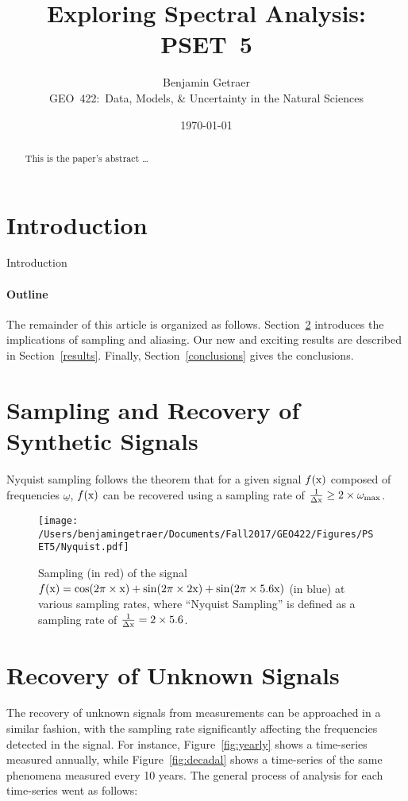 \documentclass[11pt]{article}
\title{Exploring Spectral Analysis: PSET~5}
\author{
        Benjamin Getraer \\
        GEO~422:~Data, Models, \& Uncertainty in the Natural Sciences\\
}
\date{\today}
\begin{document}
\maketitle

\begin{abstract}
This is the paper's abstract \ldots
\end{abstract}

\section{Introduction}
Introduction

\paragraph{Outline}
The remainder of this article is organized as follows.
Section~\ref{sec:synthetic} introduces the implications of sampling and aliasing.
Our new and exciting results are described in Section~\ref{results}.
Finally, Section~\ref{conclusions} gives the conclusions.

\section{Sampling and Recovery of Synthetic Signals}\label{sec:synthetic}
Nyquist sampling follows the theorem that for a given signal $f(\rm{x})$ composed of frequencies $\underline{\omega}$, $f(\rm{x})$ can be recovered using a sampling rate of $\frac{1}{\Delta\rm{x}}\ge2\times \omega_{\text{max}}$.

\begin{figure}[h!]
\centering
\texttt{[image: /Users/benjamingetraer/Documents/Fall2017/GEO422/Figures/PSET5/Nyquist.pdf]}
\caption{Sampling (in red) of the signal $f(\rm{x})=\cos(2\pi\times\rm{x}) +\sin(2\pi\times2\rm{x}) +\sin(2\pi\times5.6\rm{x})$ (in blue) at various sampling rates, where ``Nyquist Sampling'' is defined as a sampling rate of $\frac{1}{\Delta\rm{x}}=2\times5.6$.}
\label{fig:nyquist}
\end{figure}

\section{Recovery of Unknown Signals}\label{sec:unknown}
The recovery of unknown signals from measurements can be approached in a similar fashion, with the sampling rate significantly affecting the frequencies detected in the signal. For instance, Figure~\ref{fig:yearly} shows a time-series measured annually, while Figure~\ref{fig:decadal} shows a time-series of the same phenomena measured every 10 years. The general process of analysis for each time-series went as follows: 
\end{document}
